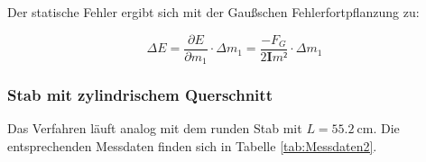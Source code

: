 Der statische Fehler ergibt sich mit der Gaußschen Fehlerfortpflanzung zu: 

\begin{equation*}
\Delta E = \frac{\partial E}{\partial m_1}\cdot \Delta m_1 
= \frac{-F_G}{2\symbf{I}m²} \cdot \Delta m_1
\end{equation*}


\subsubsection{Stab mit zylindrischem Querschnitt}

Das Verfahren läuft analog mit dem runden Stab mit $L = \SI{55.2}{\centi\meter}$.
Die entsprechenden Messdaten finden sich in Tabelle \ref{tab:Messdaten2}. 

